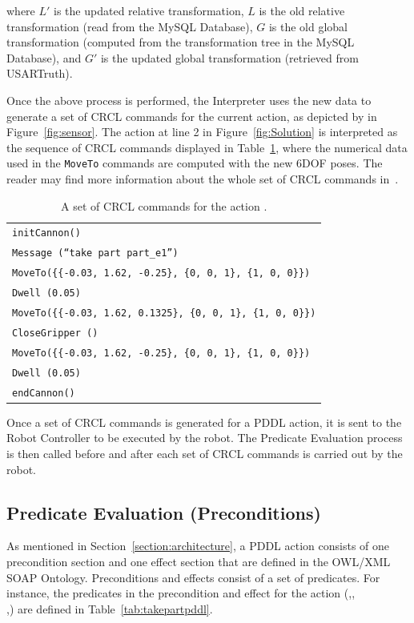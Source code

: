 where $L'$ is the updated relative transformation, $L$ is the old relative transformation (read from the \textsf{MySQL Database}), $G$ is the old global transformation (computed from the transformation tree in the \textsf{MySQL Database}), and $G'$ is the updated global transformation (retrieved from USARTruth).

Once the above process is performed, the \textsf{Interpreter} uses the new data to generate a set of CRCL commands for the current action, as depicted by  in Figure~\ref{fig:sensor}. The  action at line 2 in Figure~\ref{fig:Solution} is interpreted as the sequence of CRCL commands displayed in Table~\ref{tab:takepart}, where the numerical data used in the \texttt{MoveTo} commands are computed with the new 6DOF poses. The reader may find more information about the whole set of CRCL commands in~\cite{Balakirsky2012-1}.

\begin{table}[h!]

\caption{A set of CRCL commands for the action .}
\centering
  \begin{tabular}{l}
    \hline
    \texttt{initCannon()}\\
    \texttt{Message (``take part part\_e1'')}\\
    \texttt{MoveTo(\{\{-0.03, 1.62, -0.25\}, \{0, 0, 1\}, \{1, 0, 0\}\})}\\
    \texttt{Dwell (0.05)}\\
    \texttt{MoveTo(\{\{-0.03, 1.62, 0.1325\}, \{0, 0, 1\}, \{1, 0, 0\}\})} \\
    \texttt{CloseGripper ()} \\
    \texttt{MoveTo(\{\{-0.03, 1.62, -0.25\}, \{0, 0, 1\}, \{1, 0, 0\}\})}\\
    \texttt{Dwell (0.05)}\\
    \texttt{endCannon()}\\
    \hline
  \end{tabular}
  \label{tab:takepart}
\end{table}

Once a set of CRCL commands is generated for a PDDL action, it is sent to the \textsf{Robot Controller} to be executed by the robot. The \textsf{Predicate Evaluation} process is then called before and after each set of CRCL commands is carried out by the robot.

\subsection{Predicate Evaluation (Preconditions)}
As mentioned in Section~\ref{section:architecture}, a PDDL action consists of one precondition section and one effect section that are defined in the \textsf{OWL/XML SOAP Ontology}. Preconditions and effects consist of a set of predicates. For instance, the predicates in the precondition and effect for the action (,,\\,) are defined in Table~\ref{tab:takepartpddl}.


